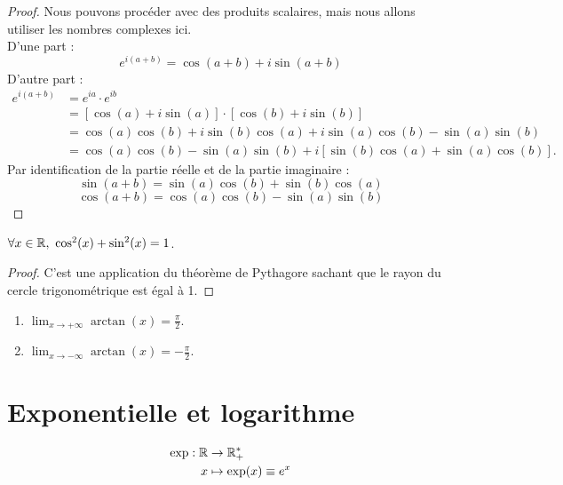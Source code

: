 \begin{proof}
    Nous pouvons procéder avec des produits scalaires, mais nous allons utiliser les nombres complexes ici.
    \\
    D'une part :
    \[e^{i (a + b)} = \cos(a + b) + i\sin(a + b)\]
    D'autre part :
    \begin{align*}
        e^{i (a + b)} &= e^{ia} \cdot e^{ib} \\
        &= [\cos(a) + i \sin(a)] \cdot [\cos(b) + i \sin(b)] \\
        &= \cos(a) \cos(b) + i\sin(b)\cos(a) + i\sin(a)\cos(b) - \sin(a)\sin(b) \\
        &= \cos(a)\cos(b) - \sin(a)\sin(b) + i [\sin(b)\cos(a) + \sin(a) \cos(b)].
    \end{align*}
    Par identification de la partie réelle et de la partie imaginaire :
    \[ \sin(a + b) = \sin(a) \cos(b) + \sin(b) \cos(a) \]
	\[ \cos(a + b) = \cos(a) \cos(b) - \sin(a) \sin(b) \]
\end{proof}

\begin{proposition}
    $\forall x \in \mathbb{R},\ \cos^2(x) + \sin^2(x) = 1$.
\end{proposition}

\begin{proof}
    C'est une application du théorème de Pythagore sachant que le rayon du cercle trigonométrique est égal à 1.
\end{proof}

\begin{proposition}
	
    \begin{enumerate}
        \item $\lim_{x \to +\infty} \arctan(x) = \frac{\pi}{2}$.
        \item $\lim_{x \to -\infty} \arctan(x) = -\frac{\pi}{2}$.
    \end{enumerate}
\end{proposition}

\section{Exponentielle et logarithme}

\begin{definition}
	\begin{align*}
		\exp : \mathbb{R} &\to \mathbb{R}_+^* \\
        x &\mapsto \exp(x) \equiv e^x
	\end{align*}
\end{definition}

